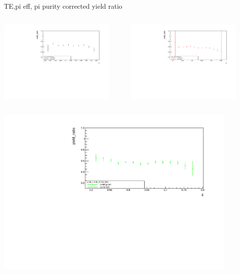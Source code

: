 \begin{frame}{TE,pi eff, pi purity corrected yield ratio}
\begin{columns}
\begin{column}[T]{0.5\textwidth}
\includegraphics[width = 0.9\textwidth]{results/yield/statistics_corr/x_Q2_z_45_4750_40_ratio.pdf}
\end{column}
\begin{column}[T]{0.5\textwidth}
\includegraphics[width = 0.9\textwidth]{results/yield/statistics_corr/x_Q2_z_45_4750_50_ratio.pdf}
\end{column}
\end{columns}
\begin{columns}
\begin{column}[T]{0.5\textwidth}
\includegraphics[width = 0.9\textwidth]{results/yield/statistics_corr/x_Q2_z_45_4750_60_ratio.pdf}

\end{column}
\end{columns}
\end{frame}
